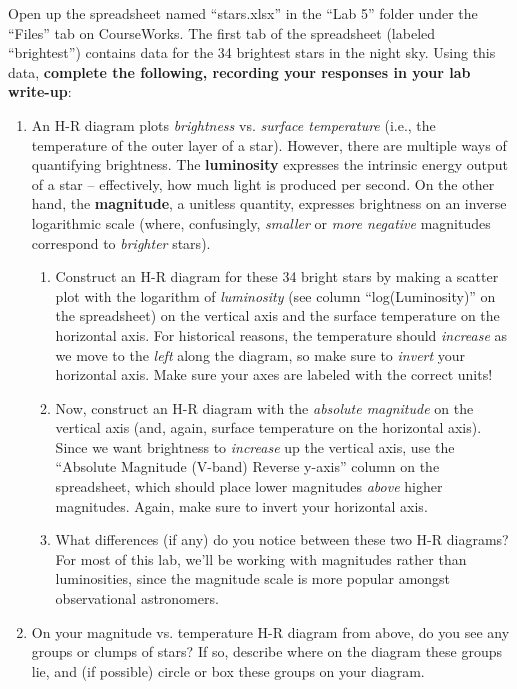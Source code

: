 \documentclass[11pt]{article}
\begin{document}
Open up the spreadsheet named ``stars.xlsx'' in the ``Lab 5'' folder under the ``Files'' tab on CourseWorks. The first tab of the spreadsheet (labeled ``brightest'') contains data for the 34 brightest stars in the night sky. Using this data, \textbf{complete the following, recording your responses in your lab write-up}:
\begin{enumerate}
    \item An H-R diagram plots \emph{brightness} vs. \emph{surface temperature} (i.e., the temperature of the outer layer of a star). However, there are multiple ways of quantifying brightness. The \textbf{luminosity} expresses the intrinsic energy output of a star -- effectively, how much light is produced per second. On the other hand, the \textbf{magnitude}, a unitless quantity, expresses brightness on an inverse logarithmic scale (where, confusingly, \emph{smaller} or \emph{more negative} magnitudes correspond to \emph{brighter} stars).
    \begin{enumerate}
        \item Construct an H-R diagram for these 34 bright stars by making a scatter plot with the logarithm of \emph{luminosity} (see column ``log(Luminosity)'' on the spreadsheet) on the vertical axis and the surface temperature on the horizontal axis. For historical reasons, the temperature should \emph{increase} as we move to the \emph{left} along the diagram, so make sure to \emph{invert} your horizontal axis. Make sure your axes are labeled with the correct units!
        
        \item Now, construct an H-R diagram with the \emph{absolute magnitude} on the vertical axis (and, again, surface temperature on the horizontal axis). Since we want brightness to \emph{increase} up the vertical axis, use the ``Absolute Magnitude (V-band) Reverse y-axis'' column on the spreadsheet, which should place lower magnitudes \emph{above} higher magnitudes. Again, make sure to invert your horizontal axis.
        
        \item What differences (if any) do you notice between these two H-R diagrams? For most of this lab, we'll be working with magnitudes rather than luminosities, since the magnitude scale is more popular amongst observational astronomers.
    \end{enumerate}
    
    \item On your magnitude vs. temperature H-R diagram from above, do you see any groups or clumps of stars? If so, describe where on the diagram these groups lie, and (if possible) circle or box these groups on your diagram.
    

\end{enumerate}
\end{document}
